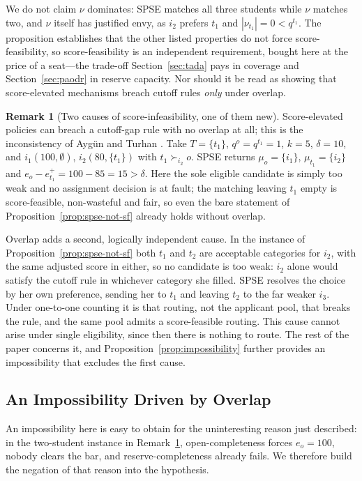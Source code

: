 \documentclass[a4paper,twoside]{article}
\theoremstyle{definition}
\newtheorem{nremark}{Remark}
\begin{document}
We do not claim $\nu$ dominates: SPSE matches all three students while $\nu$ matches two, and $\nu$ itself has justified envy, as $i_2$ prefers $t_1$ and $|\nu_{t_1}|=0<q^{t_1}$. The proposition establishes that the other listed properties do not force score-feasibility, so score-feasibility is an independent requirement, bought here at the price of a seat---the trade-off Section~\ref{sec:tada} pays in coverage and Section~\ref{sec:paodr} in reserve capacity. Nor should it be read as showing that score-elevated mechanisms breach cutoff rules \emph{only} under overlap.

\begin{nremark}[Two causes of score-infeasibility, one of them new]
\label{rem:overlap-cause}
Score-elevated policies can breach a cutoff-gap rule with no overlap at all; this is the inconsistency of Ayg\"un and Turhan \cite{AyTu23b}. Take $T=\{t_1\}$, $q^o=q^{t_1}=1$, $k=5$, $\delta=10$, and $i_1(100,\emptyset)$, $i_2(80,\{t_1\})$ with $t_1\succ_{i_2}o$. SPSE returns $\mu_o=\{i_1\}$, $\mu_{t_1}=\{i_2\}$ and $e_o-e_{t_1}^+=100-85=15>\delta$. Here the sole eligible candidate is simply too weak and no assignment decision is at fault; the matching leaving $t_1$ empty is score-feasible, non-wasteful and fair, so even the bare statement of Proposition~\ref{prop:spse-not-sf} already holds without overlap.

Overlap adds a second, logically independent cause. In the instance of Proposition~\ref{prop:spse-not-sf} both $t_1$ and $t_2$ are acceptable categories for $i_2$, with the same adjusted score in either, so no candidate is too weak: $i_2$ alone would satisfy the cutoff rule in whichever category she filled. SPSE resolves the choice by her own preference, sending her to $t_1$ and leaving $t_2$ to the far weaker $i_3$. Under one-to-one counting it is that routing, not the applicant pool, that breaks the rule, and the same pool admits a score-feasible routing. This cause cannot arise under single eligibility, since then there is nothing to route. The rest of the paper concerns it, and Proposition~\ref{prop:impossibility} further provides an impossibility that excludes the first cause.
\end{nremark}

\subsection{An Impossibility Driven by Overlap}

An impossibility here is easy to obtain for the uninteresting reason just described: in the two-student instance in Remark~\ref{rem:overlap-cause}, open-completeness forces $e_o=100$, nobody clears the bar, and reserve-completeness already fails. We therefore build the negation of that reason into the hypothesis.
\end{document}
